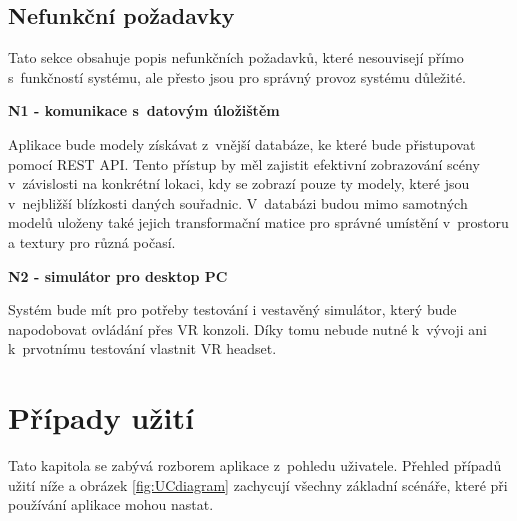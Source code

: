 \documentclass[thesis=B,czech]{FITthesis}[2012/06/26]
\begin{document}
\subsection{Nefunkční požadavky}	
	Tato sekce obsahuje popis nefunkčních požadavků, které nesouvisejí přímo s~funkčností systému, ale přesto jsou pro správný provoz systému důležité.
			
 		\begin{description}
 		
 		\item \textbf{N1 - komunikace s~datovým úložištěm}
 		
 		Aplikace bude modely získávat z~vnější databáze, ke které bude přistupovat pomocí REST API. Tento přístup by měl zajistit efektivní zobrazování scény v~závislosti na konkrétní lokaci, kdy se zobrazí pouze ty modely, které jsou v~nejbližší blízkosti daných souřadnic. V~databázi budou mimo samotných modelů uloženy také jejich transformační matice pro správné umístění v~prostoru a textury pro různá počasí.
 		
 		\item \textbf{N2 - simulátor pro desktop PC}
 		
 		Systém bude mít pro potřeby testování i vestavěný simulátor, který bude napodobovat ovládání přes VR konzoli. Díky tomu nebude nutné k~vývoji ani k~prvotnímu testování vlastnit VR headset.
 		
 		
 	\end{description}	
 	
	\section{Případy užití}
	Tato kapitola se zabývá rozborem aplikace z~pohledu uživatele. Přehled případů užití níže a obrázek \ref{fig:UCdiagram} zachycují všechny základní scénáře, které při používání aplikace mohou nastat.
	
\end{document}
